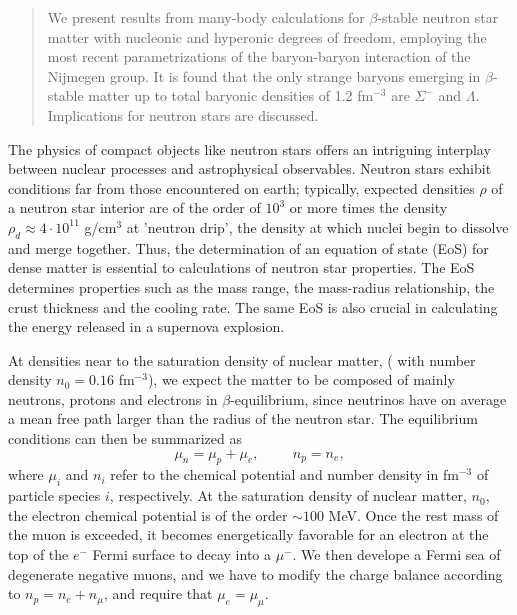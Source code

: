 \author{L.\ Engvik, and M.\  Hjorth-Jensen}

\address{Department of Physics, University of Oslo, N-0316 Oslo, Norway}

\maketitle

\begin{abstract}

We present results from many-body calculations 
for $\beta$-stable neutron star 
matter with nucleonic and
hyperonic degrees of freedom, employing the most recent parametrizations
of the baryon-baryon interaction of the Nijmegen group. 
It is found that the only strange baryons emerging in $\beta$-stable matter 
up to total baryonic densities of 1.2 fm$^{-3}$ are $\Sigma^-$ and 
$\Lambda$.
Implications for neutron stars are discussed.    


\end{abstract}




The physics of compact objects like neutron stars offers
an intriguing interplay between nuclear processes  and
astrophysical observables.
Neutron stars exhibit conditions far from those 
encountered on earth; typically, expected densities $\rho$ 
of a neutron star interior are of the
order of $10^3$ or more times the density  
$\rho_d\approx 4\cdot 10^{11}$ g/cm$^{3}$ at 'neutron drip',
the density at which nuclei begin to 
dissolve and merge together.
Thus, the determination of an equation of state (EoS) 
for dense matter is essential to calculations of neutron 
star properties. The EoS determines properties  such as 
the mass range, the mass-radius relationship, the crust 
thickness and the cooling rate.
The same EoS is also crucial
in calculating the energy released in a supernova explosion.

At densities near to the saturation density of nuclear 
matter, ( with number density $n_0=0.16$ fm$^{-3}$),  
we expect the matter to be composed of mainly neutrons, protons  
and electrons in $\beta$-equilibrium, since neutrinos have on average a
mean free path larger than the radius of the neutron star. The 
equilibrium conditions can then be summarized as
\begin{equation}
    \mu_n=\mu_p+\mu_e,  \hspace{1cm} n_p = n_e,
     \label{eq:npebetaequilibrium}
\end{equation}
where $\mu_i$ and $n_i$ refer to the chemical potential and number density
in fm$^{-3}$ of particle species $i$, respectively. 
At the saturation density of nuclear matter, $n_0$, 
the electron chemical potential is
of the order $\sim 100$ MeV.
Once the rest mass of the muon is exceeded, it becomes
energetically favorable for an electron at the top
of the $e^-$ Fermi surface to decay into a
$\mu^-$. We then develope a Fermi sea of degenerate negative muons,
and we have to modify the charge balance according to $n_p = n_e+n_{\mu}$,
and require that $\mu_e = \mu_{\mu}$.

